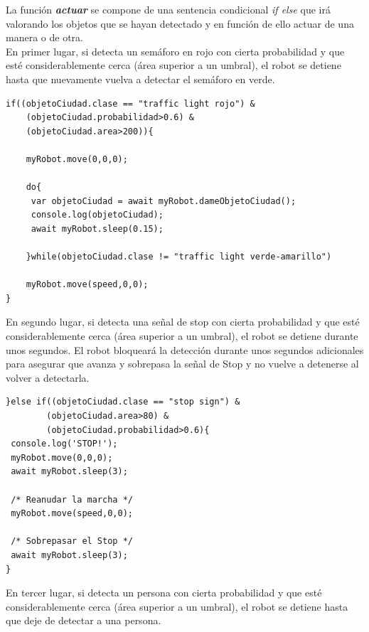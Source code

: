 \documentclass{report}
\begin{document}
La función \textit{\textbf{actuar}} se compone de una sentencia condicional \textit{if else} que irá valorando los objetos que se hayan detectado y en función de ello actuar de una manera o de otra.
\\

En primer lugar, si detecta un semáforo en rojo con cierta probabilidad y que esté considerablemente cerca (área superior a un umbral), el robot se detiene hasta que nuevamente vuelva a detectar el semáforo en verde.

\begin{lstlisting}[backgroundcolor = \color{light-gray},
				   aboveskip = 1em,
				   belowskip = 2em,
                   xleftmargin = 2cm,
                   framexleftmargin = 1em,
                   basicstyle=\small]
if((objetoCiudad.clase == "traffic light rojo") &
	(objetoCiudad.probabilidad>0.6) &
	(objetoCiudad.area>200)){
	
	myRobot.move(0,0,0);

	do{
	 var objetoCiudad = await myRobot.dameObjetoCiudad();
	 console.log(objetoCiudad);
	 await myRobot.sleep(0.15);

	}while(objetoCiudad.clase != "traffic light verde-amarillo")

	myRobot.move(speed,0,0);
}
\end{lstlisting}

En segundo lugar, si detecta una señal de stop con cierta probabilidad y que esté considerablemente cerca (área superior a un umbral), el robot se detiene durante unos segundos. El robot bloqueará la detección durante unos segundos adicionales para asegurar que avanza y sobrepasa la señal de Stop y no vuelve a detenerse al volver a detectarla.

\begin{lstlisting}[backgroundcolor = \color{light-gray},
				   aboveskip = 2em,
				   belowskip = 2em,
                   xleftmargin = 2cm,
                   framexleftmargin = 1em,
                   basicstyle=\small]
}else if((objetoCiudad.clase == "stop sign") &
        (objetoCiudad.area>80) & 
        (objetoCiudad.probabilidad>0.6){
 console.log('STOP!');
 myRobot.move(0,0,0);
 await myRobot.sleep(3);
 
 /* Reanudar la marcha */
 myRobot.move(speed,0,0);
 
 /* Sobrepasar el Stop */
 await myRobot.sleep(3);
}
\end{lstlisting}

En tercer lugar, si detecta un persona con cierta probabilidad y que esté considerablemente cerca (área superior a un umbral), el robot se detiene hasta que deje de detectar a una persona.
\end{document}
